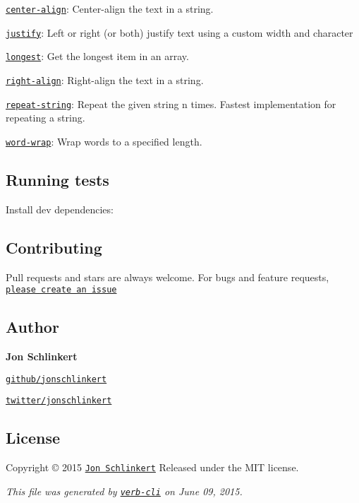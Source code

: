 \begin{DoxyItemize}
\item \href{https://github.com/jonschlinkert/center-align}{\tt center-\/align}\+: Center-\/align the text in a string.
\item \href{https://github.com/bahamas10/node-justify}{\tt justify}\+: Left or right (or both) justify text using a custom width and character
\item \href{https://github.com/jonschlinkert/longest}{\tt longest}\+: Get the longest item in an array.
\item \href{https://github.com/jonschlinkert/right-align}{\tt right-\/align}\+: Right-\/align the text in a string.
\item \href{https://github.com/jonschlinkert/repeat-string}{\tt repeat-\/string}\+: Repeat the given string n times. Fastest implementation for repeating a string.
\item \href{https://github.com/jonschlinkert/word-wrap}{\tt word-\/wrap}\+: Wrap words to a specified length.
\end{DoxyItemize}

\subsection*{Running tests}

Install dev dependencies\+:




\subsection*{Contributing}

Pull requests and stars are always welcome. For bugs and feature requests, \href{https://github.com/jonschlinkert/align-text/issues/new}{\tt please create an issue}

\subsection*{Author}

{\bfseries Jon Schlinkert}


\begin{DoxyItemize}
\item \href{https://github.com/jonschlinkert}{\tt github/jonschlinkert}
\item \href{http://twitter.com/jonschlinkert}{\tt twitter/jonschlinkert}
\end{DoxyItemize}

\subsection*{License}

Copyright © 2015 \href{https://github.com/jonschlinkert}{\tt Jon Schlinkert} Released under the M\+IT license.





{\itshape This file was generated by \href{https://github.com/assemble/verb-cli}{\tt verb-\/cli} on June 09, 2015.} 